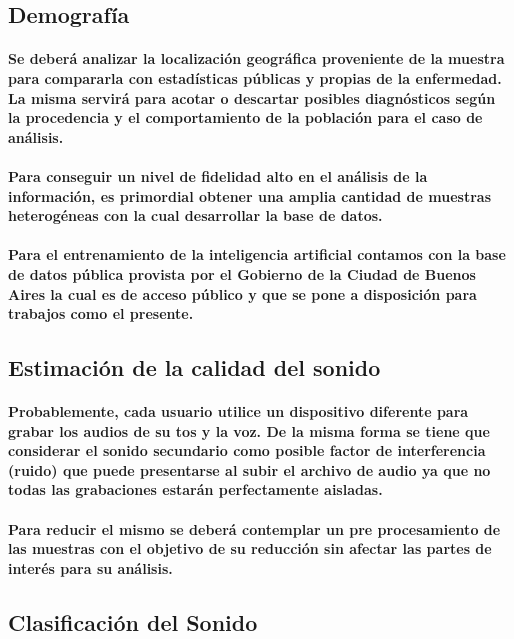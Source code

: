 \documentclass[a4paper,11pt,twocolumn]{article}
\begin{document}
\subsection{Demografía}
\paragraph{Se deberá analizar la localización geográfica proveniente de la muestra para compararla con estadísticas públicas y propias de la enfermedad. La misma servirá para acotar o descartar posibles diagnósticos según la procedencia y el comportamiento de la población para el caso de análisis.}
\paragraph{Para conseguir un nivel de fidelidad alto en el análisis de la información, es primordial obtener una amplia cantidad de muestras heterogéneas con la cual desarrollar la base de datos\cite{tp}.}
\paragraph{Para el entrenamiento de la inteligencia artificial contamos con la base de datos pública provista por el Gobierno de la Ciudad de Buenos Aires la cual es de acceso público y que se pone a disposición para trabajos como el presente.}
\subsection{Estimación de la calidad del sonido}
\paragraph{Probablemente, cada usuario utilice un dispositivo diferente para grabar los audios de su tos y la voz. De la misma forma se tiene que considerar el sonido secundario como posible factor de interferencia (ruido) que puede presentarse al subir el archivo de audio ya que no todas las grabaciones estarán perfectamente aisladas.}
\paragraph{Para reducir el mismo se deberá contemplar un pre procesamiento de las muestras con el objetivo de su reducción sin afectar las partes de interés para su análisis\cite{tp}.}
\subsection{Clasificación del Sonido}
\end{document}
